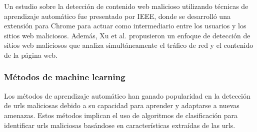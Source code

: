 Un estudio sobre la detección de contenido web malicioso utilizando técnicas de aprendizaje automático fue presentado por IEEE, donde se desarrolló una extensión para Chrome para actuar como intermediario entre los usuarios y los sitios web maliciosos\autocite{ieee2017malicious}. Además, Xu et al. propusieron un enfoque de detección de sitios web maliciosos que analiza simultáneamente el tráfico de red y el contenido de la página web\autocite{xu2013cross}.

\subsubsection*{Métodos de machine learning}
Los métodos de aprendizaje automático han ganado popularidad en la detección de \glspl{url} maliciosas debido a su capacidad para aprender y adaptarse a nuevas amenazas. Estos métodos implican el uso de algoritmos de clasificación para identificar \glspl{url} maliciosas basándose en características extraídas de las \glspl{url}.





